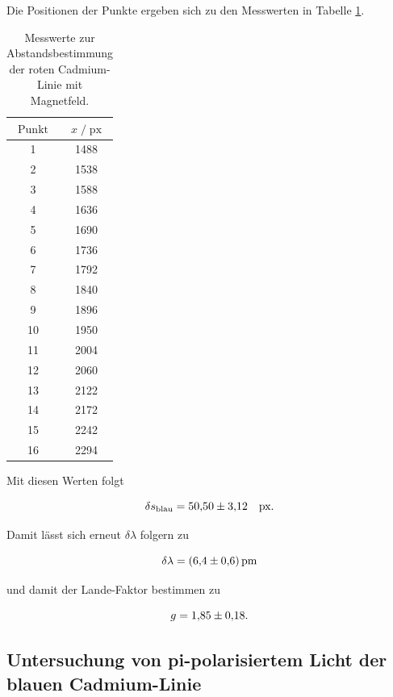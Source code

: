Die Positionen der Punkte ergeben sich zu den Messwerten in Tabelle \ref{tab:mess5}. 

\begin{table}[H]
    \centering
    \caption{Messwerte zur Abstandsbestimmung der roten Cadmium-Linie mit Magnetfeld.}
    \label{tab:mess5}
    \begin{tabular}{c c}
    \toprule
    $\text{Punkt}$ & $x \;/\; \text{px}$ \\
    \midrule
        1 & 1488\\
        2 & 1538\\
        3 & 1588\\
        4 & 1636\\
        5 & 1690\\
        6 & 1736\\
        7 & 1792\\
        8 & 1840\\
        9 & 1896\\
        10 & 1950\\
        11 & 2004\\
        12 & 2060\\
        13 & 2122\\
        14 & 2172\\
        15 & 2242\\
        16 & 2294\\
    \bottomrule
    \end{tabular}
\end{table}

Mit diesen Werten folgt 

\begin{equation*}
    \delta s_\text{blau} = \num{50.5+-3.12}\quad \text{px}.
\end{equation*}

Damit lässt sich erneut $\delta \lambda$ folgern zu 

\begin{equation*}
    \delta \lambda = \SI{6.4+-0.6}{\pico\metre}
\end{equation*}

und damit der Lande-Faktor bestimmen zu 

\begin{equation*}
    g = \num{1.85+-0.18}.
\end{equation*}

\subsection{Untersuchung von pi-polarisiertem Licht der blauen Cadmium-Linie}



